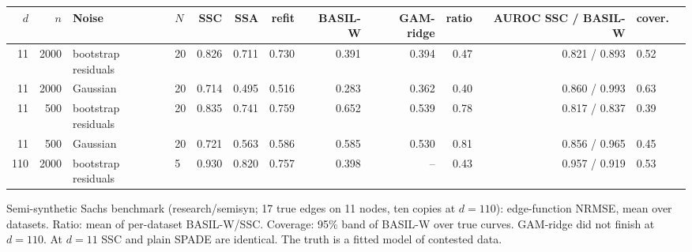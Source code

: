 \begin{adjustbox}{max width=\textwidth}
\begin{tabular}{rrllrrrrrrrll}
\toprule
$d$ & $n$ & Noise & $N$ & SSC & SSA & refit & BASIL-W & GAM-ridge & ratio & AUROC SSC / BASIL-W & cover. \\
\midrule
11 & 2000 & bootstrap residuals & 20 & 0.826 & 0.711 & 0.730 & 0.391 & 0.394 & 0.47 & 0.821 / 0.893 & 0.52 \\
11 & 2000 & Gaussian & 20 & 0.714 & 0.495 & 0.516 & 0.283 & 0.362 & 0.40 & 0.860 / 0.993 & 0.63 \\
11 & 500 & bootstrap residuals & 20 & 0.835 & 0.741 & 0.759 & 0.652 & 0.539 & 0.78 & 0.817 / 0.837 & 0.39 \\
11 & 500 & Gaussian & 20 & 0.721 & 0.563 & 0.586 & 0.585 & 0.530 & 0.81 & 0.856 / 0.965 & 0.45 \\
110 & 2000 & bootstrap residuals & 5 & 0.930 & 0.820 & 0.757 & 0.398 & -- & 0.43 & 0.957 / 0.919 & 0.53 \\
\bottomrule
\end{tabular}
\end{adjustbox}

\smallskip
{\footnotesize Semi-synthetic Sachs benchmark (research/semisyn; 17 true edges on 11 nodes, ten copies at $d=110$): edge-function NRMSE, mean over datasets. Ratio: mean of per-dataset BASIL-W/SSC. Coverage: 95\% band of BASIL-W over true curves. GAM-ridge did not finish at $d=110$. At $d=11$ SSC and plain SPADE are identical. The truth is a fitted model of contested data.}
